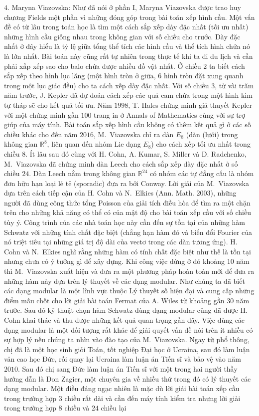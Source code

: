 \begin{multicols}{2}
	\vskip 0.05cm
	$4.$ Maryna Viazovska: Như đã nói ở phần I, Maryna Viazovska được trao huy chương Fields một phần vì những đóng góp trong bài toán xếp hình cầu.
	\vskip 0.05cm
	Một vấn đề có từ lâu trong toán học là tìm một cách sắp xếp dày đặc nhất (tối ưu nhất) những hình cầu giống nhau trong không gian với số chiều cho trước. Dày đặc nhất ở đây hiểu là tỷ lệ giữa tổng thể tích các hình cầu và thể tích hình chứa nó là lớn nhất. Bài toán này cũng rất tự nhiên trong thực tế khi ta đi du lịch và cần phải xắp xếp sao cho balo chứa được nhiều đồ vật nhất. Ở chiều $2$ ta biết cách sắp xếp theo hình lục lăng (một hình tròn ở giữa, $6$ hình tròn đặt xung quanh trong một lục giác đều) cho ta cách xếp dày đặc nhất. Với số chiều $3$, từ vài trăm năm trước, J. Kepler đã dự đoán cách xếp các quả cam chứa trong một hình kim tự tháp sẽ cho kết quả tối ưu. Năm $1998$, T. Hales chứng minh giả thuyết Kepler với một chứng minh gần $100$ trang in ở Annals of Mathematics cùng với sự trợ giúp của máy tính. Bài toán sắp xếp hình cầu không có thêm kết quả gì ở các số chiều khác cho đến năm $2016$, M.~Viazovska chỉ ra dàn $E_{8}$ (dàn (lưới) trong không gian $\mathbb{R}^8$, liên quan đến nhóm Lie dạng $E_{8}$) cho cách xếp tối ưu nhất trong chiều $8$. Ít lâu sau đó cùng với H. Cohn, A. Kumar, S. Miller và D. Radchenko, M.~Viazovska đã chứng minh dàn Leech cho cách sắp xếp dày đặc nhất ở số chiều $24$. Dàn Leech nằm trong không gian $\mathbb{R}^{24}$ có nhóm các tự đẳng cấu là nhóm đơn hữu hạn loại lẻ tẻ (sporadic) đưa ra bởi Conway. Lời giải của M.~Viazovska dựa trên cách tiếp cận của H. Cohn và N.~Elkies (Ann. Math. $2003$), những người đã dùng công thức tổng Poisson của giải tích điều hòa để tìm ra một chặn trên cho những khả năng có thể có của mật độ cho bài toán xếp cầu với số chiều tùy ý. Công trình của các nhà toán học này cần đến sự tồn tại của những hàm Schwatz với những tính chất đặc biệt (chẳng hạn hàm đó và biến đổi Fourier của nó triệt tiêu tại những giá trị độ dài của vectơ trong các dàn tương ứng). H. Cohn và N.~Elkies nghĩ rằng những hàm có tính chất đặc biệt như thế là tồn tại nhưng chưa có ý tưởng gì để xây dựng. Khi công việc dừng ở đó khoảng $10$ năm thì M.~Viazovska xuất hiện và đưa ra một phương pháp hoàn toàn mới để đưa ra những hàm này dựa trên lý thuyết về các dạng modular. Như chúng ta đã biết các dạng modular là một lĩnh vực thuộc Lý thuyết số hiện đại và cung cấp những điểm mấu chốt cho lời giải bài toán Fermat của A. Wiles từ khoảng gần $30$ năm trước. Sau đó kỹ thuật chọn hàm Schwatz dùng dạng modular cũng đã được H. Cohn khai thác và thu được những kết quả quan trọng gần đây. Việc dùng các dạng modular là một đối tượng rất khác để giải quyết vấn đề nói trên ít nhiều có sự hợp lý nếu chúng ta nhìn vào đào tạo của M.~Viazovska. Ngay từ phổ thông, chị đã là một học sinh giỏi Toán, tốt nghiệp Đại học ở Ucraina, sau đó làm luận văn cao học Đức, rồi quay lại Ucraina làm luận án Tiến sĩ và bảo vệ vào năm $2010$. Sau đó chị sang Đức làm luận án Tiến sĩ với một trong hai người thầy hướng dẫn là Don Zagier, một chuyên gia về nhiều thứ trong đó có lý thuyết các dạng modular. Một điều đáng ngạc nhiên là mặc dù lời giải bài toán xếp cầu trong trường hợp $3$ chiều rất dài và cần đến máy tính kiểm tra nhưng lời giải trong trường hợp $8$ chiều và $24$ chiều lại 
\end{multicols}
